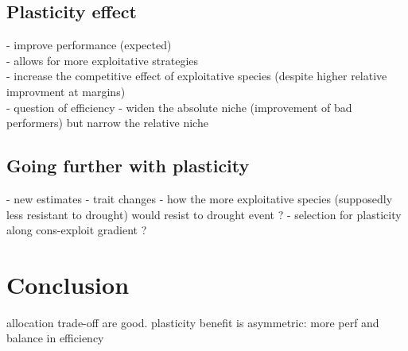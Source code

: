 \documentclass[review]{elsarticle}
\begin{document}
\subsection{Plasticity effect}
- improve performance (expected)\\
- allows for more exploitative strategies\\
- increase the competitive effect of exploitative species (despite higher relative improvment at margins)\\
- question of efficiency
- widen the absolute niche (improvement of bad performers) but narrow the relative niche

\subsection{Going further with plasticity}
- new estimates
- trait changes
- how the more exploitative species (supposedly less resistant to drought) would resist to drought event ?
- selection for plasticity along cons-exploit gradient ?

\section{Conclusion}
allocation trade-off are good. plasticity benefit is asymmetric: more perf and balance in efficiency

%
\end{document}
